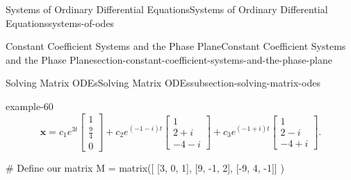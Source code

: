\documentclass[oneside,10pt,]{book}
\numberwithin{equation}{section}
\renewcommand{\vec}[1]{\mathbf{#1}}
\begin{document}
\begin{chapterptx}{Systems of Ordinary Differential Equations}{}{Systems of Ordinary Differential Equations}{}{}{systems-of-odes}
\begin{sectionptx}{Constant Coefficient Systems and the Phase Plane}{}{Constant Coefficient Systems and the Phase Plane}{}{}{section-constant-coefficient-systems-and-the-phase-plane}
\begin{subsectionptx}{Solving Matrix ODEs}{}{Solving Matrix ODEs}{}{}{subsection-solving-matrix-odes}
\begin{example}{}{example-60}
\begin{equation*}
\vec{x} = c_{1}e^{3t}\begin{bmatrix}1 \\ \frac{9}{4} \\ 0\end{bmatrix} + c_{2}e^{(-1 - i)t}\begin{bmatrix} 1 \\ 2 + i \\ -4 - i \end{bmatrix} + c_{3}e^{(-1 + i)t}\begin{bmatrix} 1 \\ 2 - i \\ -4 + i \end{bmatrix}.
\end{equation*}
%
\end{example}
\begin{sageinput}
# Define our matrix
M = matrix([ [3, 0, 1],
[9, -1, 2],
[-9, 4, -1]] )


\end{sageinput}
\end{subsectionptx}
\end{sectionptx}
\end{chapterptx}
\end{document}
